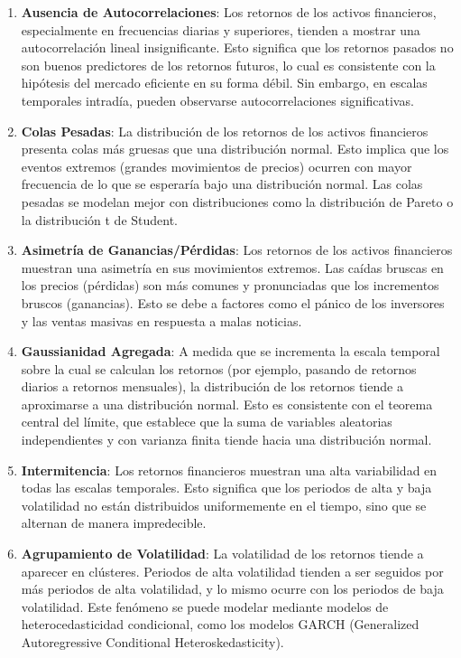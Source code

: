 \documentclass[a4paper,12pt]{report}
\begin{document}
\begin{enumerate}
    \item \textbf{Ausencia de Autocorrelaciones}: Los retornos de los activos financieros, especialmente en 
    frecuencias diarias y superiores, tienden a mostrar una autocorrelación lineal insignificante. Esto significa 
    que los retornos pasados no son buenos predictores de los retornos futuros, lo cual es consistente con la hipótesis 
    del mercado eficiente en su forma débil. Sin embargo, en escalas temporales intradía, pueden observarse autocorrelaciones significativas.
    \item \textbf{Colas Pesadas}: La distribución de los retornos de los activos financieros presenta colas más gruesas que una distribución 
    normal. Esto implica que los eventos extremos (grandes movimientos de precios) ocurren con mayor frecuencia de lo que se esperaría bajo 
    una distribución normal. Las colas pesadas se modelan mejor con distribuciones como la distribución de Pareto o la distribución t de Student.
    \item \textbf{Asimetría de Ganancias/Pérdidas}: Los retornos de los activos financieros muestran una asimetría en sus movimientos extremos. 
    Las caídas bruscas en los precios (pérdidas) son más comunes y pronunciadas que los incrementos bruscos (ganancias). Esto se debe a factores 
    como el pánico de los inversores y las ventas masivas en respuesta a malas noticias.
    \item \textbf{Gaussianidad Agregada}: A medida que se incrementa la escala temporal sobre la cual se calculan los retornos (por ejemplo, 
    pasando de retornos diarios a retornos mensuales), la distribución de los retornos tiende a aproximarse a una distribución normal. Esto es 
    consistente con el teorema central del límite, que establece que la suma de variables aleatorias independientes y con varianza finita tiende 
    hacia una distribución normal.
    \item \textbf{Intermitencia}: Los retornos financieros muestran una alta variabilidad en todas las escalas temporales. Esto significa que 
    los periodos de alta y baja volatilidad no están distribuidos uniformemente en el tiempo, sino que se alternan de manera impredecible.
    \item \textbf{Agrupamiento de Volatilidad}: La volatilidad de los retornos tiende a aparecer en clústeres. Periodos de alta volatilidad 
    tienden a ser seguidos por más periodos de alta volatilidad, y lo mismo ocurre con los periodos de baja volatilidad. Este fenómeno se 
    puede modelar mediante modelos de heterocedasticidad condicional, como los modelos GARCH (Generalized Autoregressive Conditional 
    Heteroskedasticity).
\end{enumerate}
\end{document}
